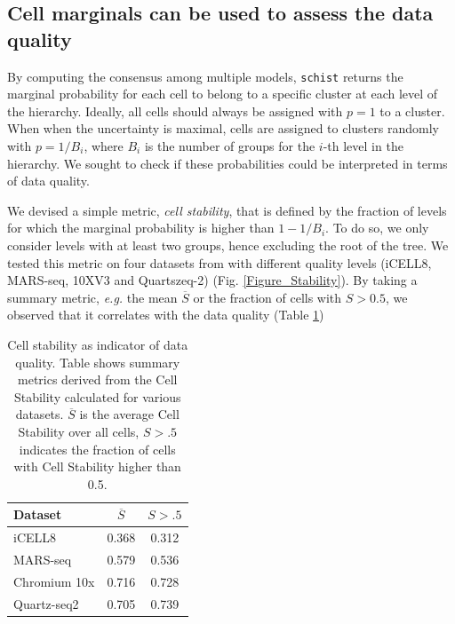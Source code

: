 \documentclass[10pt]{article}
\begin{document}
\subsection*{Cell marginals can be used to assess the data quality}

By computing the consensus among multiple models, \texttt{schist} returns the marginal probability for each cell to belong to a specific cluster at each level of the hierarchy. Ideally, all cells should always be assigned with $p=1$ to a cluster. When when the uncertainty is maximal, cells are assigned to clusters randomly with $p=1/B_i$, where $B_i$ is the number of groups for the $i$-th level in the hierarchy. We sought to check if these probabilities could be interpreted in terms of data quality. 

We devised a simple metric, \emph{cell stability}, that is defined by the fraction of levels for which the marginal probability is higher than $1-1/B_i$. To do so, we only consider levels with at least two groups, hence excluding the root of the tree. We tested this metric on four datasets from \cite{mereu_2020} with different quality levels (iCELL8, MARS-seq, 10XV3 and Quartszeq-2) (Fig. \ref{Figure_Stability}). By taking a summary metric, \emph{e.g.} the mean $\overline{S}$ or the fraction of cells with $S>0.5$, we observed that it correlates with the data quality (Table \ref{table_stability})

\begin{table}[h!]
\centering
 \begin{tabular}{|| l c c ||}
 \hline
 \textbf{Dataset} & \textbf{$\overline{S}$} & \textbf{$S > .5$} \\ [0.5ex] 

 \hline\hline
 iCELL8 \cite{mereu_2020} & 0.368 & 0.312  \\
 \hline
 MARS-seq \cite{mereu_2020} & 0.579 & 0.536  \\
 \hline
 Chromium 10x \cite{mereu_2020} & 0.716 & 0.728  \\
 \hline
 Quartz-seq2 \cite{mereu_2020} & 0.705 & 0.739 \\
 \hline
\end{tabular}
\caption{Cell stability as indicator of data quality. Table shows summary metrics derived from the Cell Stability calculated for various datasets. $\overline{S}$ is the average Cell Stability over all cells, $S>.5$ indicates the fraction of cells with Cell Stability higher than 0.5.}
\label{table_stability}
\end{table}
\end{document}
